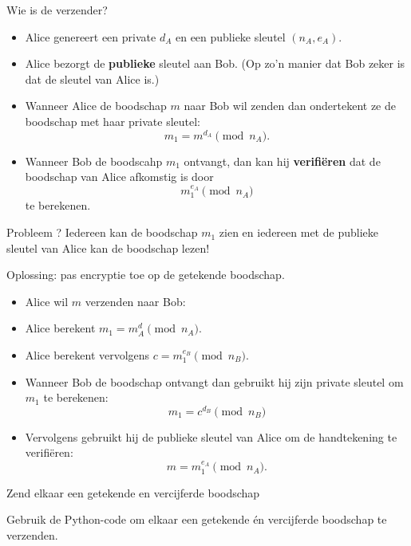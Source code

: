 \documentclass{beamer}
\begin{document}
\begin{frame}{Wie is de verzender?}
\begin{itemize}
	\item Alice genereert een private $d_A$ en een publieke sleutel $(n_A, e_A)$. 
	\pause\item  Alice bezorgt de \textbf{publieke} sleutel aan Bob. (Op zo'n manier
	dat Bob zeker is dat de sleutel van Alice is.)
	\pause \item Wanneer Alice de boodschap $m$ naar Bob wil zenden dan
	  	ondertekent ze de boodschap met haar private sleutel:
	  	\[
	  	m_1 = m^{d_A} \pmod{n_A}.
	  	\]
	\pause \item Wanneer Bob de boodscahp $m_1$ ontvangt, dan kan hij 
	\textbf{verifi\"eren} dat de boodschap van Alice afkomstig is 
	door 
	\[
	m_1^{e_A} \pmod{n_A}
	\]
	te berekenen.
\end{itemize}
\end{frame}

\begin{frame}{Probleem ?}
\pause Iedereen kan de boodschap $m_1$ zien en iedereen met de publieke 
sleutel van Alice kan de boodschap lezen!

\vspace{0.5cm}
\pause Oplossing: pas encryptie toe op de getekende boodschap.
\begin{itemize}
	\item Alice wil $m$ verzenden naar Bob:
	\item Alice berekent $m_1 = m^d_A \pmod{n_A}$.
	\item Alice berekent vervolgens $c = m_1^{e_B} \pmod{n_B}$.
	\item Wanneer Bob de boodschap ontvangt dan gebruikt hij zijn private sleutel om $m_1$
	te berekenen:
	\[
	m_1 = c^{d_B} \pmod{n_B}
	\]
	\item Vervolgens gebruikt hij de publieke sleutel van Alice om de handtekening te verifi\"eren:
	\[
	m = m_1^{e_A} \pmod{n_A}.
	\]
\end{itemize}
\end{frame}


\begin{frame}{Zend elkaar een getekende en vercijferde boodschap}

Gebruik de Python-code om elkaar een getekende \'en vercijferde boodschap te verzenden.
\end{frame}





\end{document}
